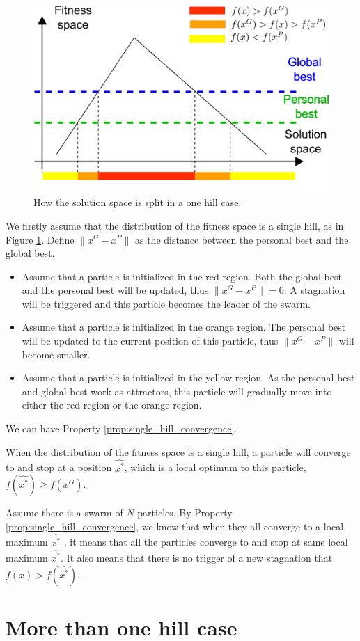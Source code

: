 \begin{figure}
\centering
\includegraphics[width=0.7\linewidth]{./one_hill_case_region_split}
\caption{How the solution space is split in a one hill case.}
\label{fig:one_hill_case_split_region}
\end{figure}

We firstly assume that the distribution of the fitness space is a single hill, as in Figure \ref{fig:one_hill_case_split_region}.
Define $ \lVert x^{G} - x^{P} \rVert $ as the distance between the personal best and the global best.
\begin{itemize}
\item Assume that a particle is initialized in the red region.
Both the global best and the personal best will be updated, thus $ \lVert x^{G} - x^{P} \rVert = 0 $.
A stagnation will be triggered and this particle becomes the leader of the swarm.
\item Assume that a particle is initialized in the orange region.
The personal best will be updated to the current position of this particle, thus $ \lVert x^{G} - x^{P} \rVert $ will become smaller.
\item Assume that a particle is initialized in the yellow region.
As the personal best and global best work as attractors, this particle will gradually move into either the red region or the orange region.
\end{itemize}

We can have Property \ref{prop:single_hill_convergence}.

\begin{property}
\label{prop:single_hill_convergence}
When the distribution of the fitness space is a single hill, 
a particle will converge to and stop at a position $ \hat{ x^{*} } $, which is a local optimum to this particle, 
$ f( \hat{x^{*}} ) \geq f(x^{G}) $. 
\end{property}

Assume there is a swarm of $ N $ particles.
By Property \ref{prop:single_hill_convergence}, we know that when they all converge to a local maximum $ \hat{ x^{*} } $
, it means that all the particles converge to and stop at same local maximum $ \hat{ x^{*} } $.
It also means that there is no trigger of a new stagnation that $ f(x) > f( \hat{ x^{*} } ) $.

\section{More than one hill case}
\label{sec:more_than_one_hill_case}







